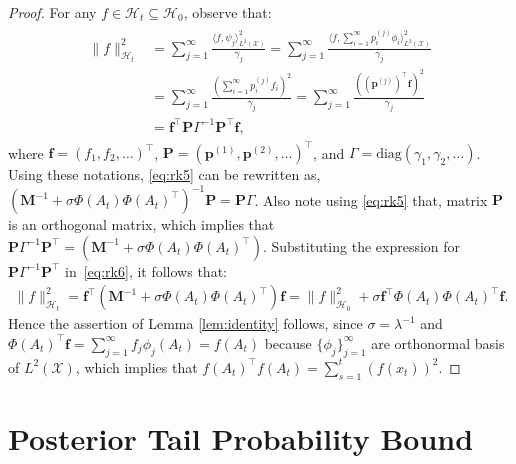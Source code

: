 \documentclass[final,12pt]{colt2026} %
\begin{document}
\begin{proof}
For any $f\in \mathcal H_t \subseteq\mathcal H_0$, observe that:
\begin{align}\label{eq:rk6}
\begin{split}
    \|f\|_{\mathcal H_t}^2 &=\sum_{j=1}^{\infty}  \frac{\langle f,\psi_j\rangle_{L^2(\mathcal X)}^2}{\gamma_j} = \sum_{j=1}^{\infty}  \frac{\langle f,\sum_{i=1}^{\infty} p^{(j)}_i  \phi_i \rangle_{L^2(\mathcal X)}^2}{\gamma_j}\\
    &= \sum_{j=1}^{\infty}  \frac{(\sum_{i=1}^{\infty} p^{(j)}_i f_i )^2}{\gamma_j}  = \sum_{j=1}^{\infty}  \frac{((\mathbf{p}^{(j)})^\top \mathbf{f})^2}{\gamma_j}\\
    & =   \mathbf{f}^\top \mathbf{P}\Gamma^{-1}\mathbf{P}^\top\mathbf{f},
\end{split}
\end{align}
where $\mathbf{f}=(f_1,f_2,\ldots)^\top$, $\mathbf{P}= (\mathbf{p}^{(1)},\mathbf{p}^{(2)},\ldots)^\top$, and $\Gamma= \text{diag}(\gamma_1,\gamma_2,\ldots)$. Using these notations, \eqref{eq:rk5} can be rewritten as, $(\mathbf{M}^{-1} + \sigma \Phi(A_t)\Phi(A_t)^\top)^{-1} \mathbf{P}=  \mathbf{P}\Gamma$. Also note using \eqref{eq:rk5} that, matrix $\mathbf{P}$ is an orthogonal matrix, which implies that $\mathbf{P}\Gamma^{-1}\mathbf{P}^\top = (\mathbf{M}^{-1} + \sigma \Phi(A_t)\Phi(A_t)^\top) $. Substituting the expression for $\mathbf{P}\Gamma^{-1}\mathbf{P}^\top$ in~\eqref{eq:rk6}, it follows that:
\begin{align}
    \|f\|_{\mathcal H_t}^2 = \mathbf{f}^\top (\mathbf{M}^{-1} + \sigma \Phi(A_t)\Phi(A_t)^\top) \mathbf{f} = \|f\|_{\mathcal H_0}^2 + \sigma \mathbf{f}^\top \Phi(A_t)\Phi(A_t)^\top \mathbf{f}.
\end{align}
Hence the assertion of Lemma \ref{lem:identity} follows, since $\sigma=  \lambda^{-1}$ and $\Phi(A_t)^\top \mathbf{f} = \sum_{j=1}^{\infty} f_j \phi_j(A_t) = f(A_t)$ because $\{\phi_j\}_{j=1}^{\infty}$ are orthonormal basis of $L^2(\mathcal X)$, which implies that $f(A_t)^\top f(A_t)= \sum_{s=1}^{t}(f(x_t))^2$.
\end{proof}

\section{Posterior Tail Probability Bound}~\label{app:LB}
\end{document}
